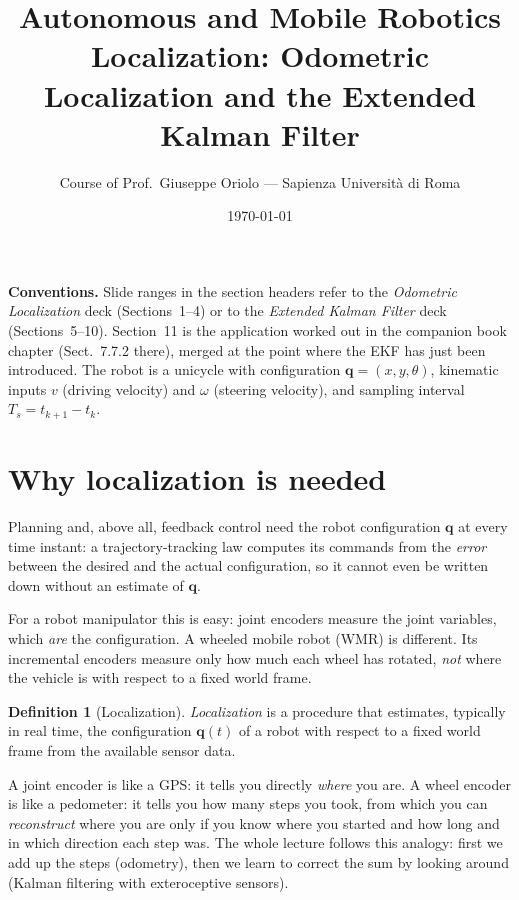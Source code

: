 \documentclass[11pt,a4paper]{article}
\title{\textbf{Autonomous and Mobile Robotics}\\[4pt]
\Large Localization: Odometric Localization and the Extended Kalman Filter}
\author{Course of Prof.\ Giuseppe Oriolo --- Sapienza Universit\`a di Roma}
\date{\today}
\newcommand{\Ts}{T_s}
\newcommand{\bq}{\boldsymbol{q}}
\newcommand{\slides}[1]{\texorpdfstring{\hspace{0.5em}{\normalfont\small\emph{(#1)}}}{}}
\theoremstyle{plain}
\theoremstyle{definition}
\newtheorem{definition}[theorem]{Definition}
\theoremstyle{remark}
\begin{document}
\maketitle
\tableofcontents

\bigskip
\noindent\textbf{Conventions.} Slide ranges in the section headers refer to the \emph{Odometric
Localization} deck (Sections~1--4) or to the \emph{Extended Kalman Filter} deck (Sections~5--10).
Section~11 is the application worked out in the companion book chapter (Sect.~7.7.2 there), merged
at the point where the EKF has just been introduced. The robot is a unicycle with configuration
$\bq=(x,y,\theta)$, kinematic inputs $v$ (driving velocity) and $\omega$ (steering velocity),
and sampling interval $\Ts=t_{k+1}-t_k$.

\section{Why localization is needed \slides{odometry deck, slide 2}}

Planning and, above all, feedback control need the robot configuration $\bq$ at every time instant:
a trajectory-tracking law computes its commands from the \emph{error} between the desired and the
actual configuration, so it cannot even be written down without an estimate of $\bq$.

For a robot manipulator this is easy: joint encoders measure the joint variables, which
\emph{are} the configuration. A wheeled mobile robot (WMR) is different. Its incremental encoders
measure only how much each wheel has rotated, \emph{not} where the vehicle is with respect to a fixed
world frame.

\begin{definition}[Localization]
\emph{Localization} is a procedure that estimates, typically in real time, the configuration
$\bq(t)$ of a robot with respect to a fixed world frame from the available sensor data.
\end{definition}

\begin{intuition}
A joint encoder is like a GPS: it tells you directly \emph{where} you are. A wheel encoder is like a
pedometer: it tells you how many steps you took, from which you can \emph{reconstruct} where you are
only if you know where you started and how long and in which direction each step was. The whole
lecture follows this analogy: first we add up the steps (odometry), then we learn to correct the
sum by looking around (Kalman filtering with exteroceptive sensors).
\end{intuition}
\end{document}
